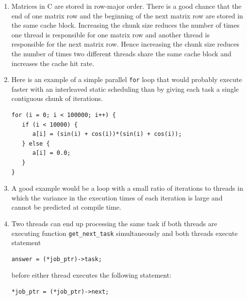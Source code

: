 \begin{enumerate}
\begin{verbatim}
double area, pi, subarea, x;
int i, n;

area = 0.0;
#pragma omp parallel private(x, subarea)
{
   subarea = 0.0;
#pragma omp for nowait
   for (i = 0; i < n; i++) {
      x = (i+0.5)/n;
      subarea += 4.0/(1.0 + x*x);
   }
#pragma omp critical
   area += subarea;
}
pi = area / n;
\end{verbatim}

\item Matrices in C are stored in row-major order.
      There is a good chance that the end of one matrix row and the beginning of
      the next matrix row are stored in the same cache block.
      Increasing the chunk size reduces the number of times one thread is
      responsible for one matrix row and another thread is responsible for
      the next matrix row.
      Hence increasing the chunk size reduces the number of times two
      different threads share the same cache block and increases the cache
      hit rate.

\item Here is an example of a simple parallel {\tt for} loop that would
      probably execute faster with an interleaved static scheduling than
      by giving each task a single contiguous chunk of iterations.

\begin{verbatim}
for (i = 0; i < 100000; i++) {
   if (i < 10000) {
      a[i] = (sin(i) + cos(i))*(sin(i) + cos(i));
   } else {
      a[i] = 0.0;
   }
}
\end{verbatim}

\item A good example would be a loop with a small ratio of iterations to
      threads in which the variance in the execution times of each iteration
      is large and cannot be predicted at compile time.

\item Two threads can end up processing the same task if both threads
      are executing function {\tt get\_next\_task} simultaneously and both
      threads execute statement

\begin{verbatim}
answer = (*job_ptr)->task;
\end{verbatim}

      before either thread executes the following statement:

\begin{verbatim}
*job_ptr = (*job_ptr)->next;
\end{verbatim}


\end{enumerate}
